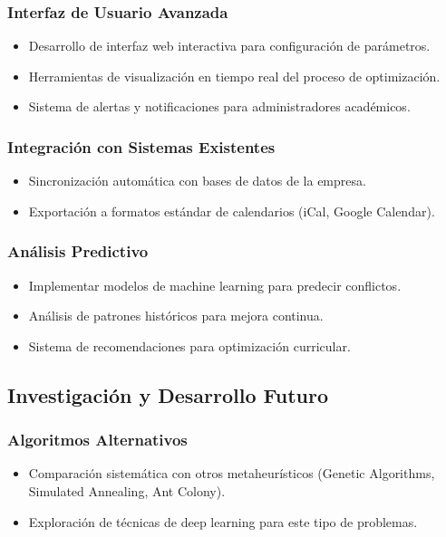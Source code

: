 \subsubsection{Interfaz de Usuario Avanzada}
\begin{itemize}
    \item Desarrollo de interfaz web interactiva para configuración de parámetros.
    \item Herramientas de visualización en tiempo real del proceso de optimización.
    \item Sistema de alertas y notificaciones para administradores académicos.
\end{itemize}

\subsubsection{Integración con Sistemas Existentes}
\begin{itemize}
    \item Sincronización automática con bases de datos de la empresa.
    \item Exportación a formatos estándar de calendarios (iCal, Google Calendar).
\end{itemize}

\subsubsection{Análisis Predictivo}
\begin{itemize}
    \item Implementar modelos de machine learning para predecir conflictos.
    \item Análisis de patrones históricos para mejora continua.
    \item Sistema de recomendaciones para optimización curricular.
\end{itemize}

\subsection{Investigación y Desarrollo Futuro}

\subsubsection{Algoritmos Alternativos}
\begin{itemize}
    \item Comparación sistemática con otros metaheurísticos (Genetic Algorithms, Simulated Annealing, Ant Colony).
    \item Exploración de técnicas de deep learning para este tipo de problemas.
\end{itemize}

